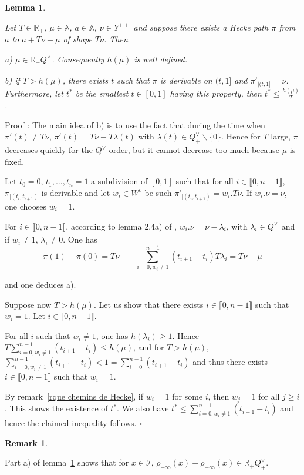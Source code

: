 \documentclass[12pt]{article}
\theoremstyle{plain}
\newtheorem{lemme}[thm]{Lemma}
\theoremstyle{definition}
\newtheorem{rque}[thm]{Remark}
\newcommand{\A}{\mathbb{A}}
\begin{document}
\begin{lemme}\label{lemme fin des chemins de Hecke longs}


Let $T\in \mathbb{R}_+$, $\mu\in \A$,  $a\in \mathbb{A}$, $\nu\in Y^{++}$ and suppose there exists a Hecke path $\pi$ from $a$ to $a+T\nu-\mu$ of shape $T\nu$. Then 

a) $\mu\in \mathbb{R}_+ Q^\vee_+$. Consequently $h(\mu)$ is well defined.

b) if $T>h(\mu)$, there exists $t$ such that $\pi$ is derivable on $(t,1]$ and $\pi'_{|(t,1]}=\nu$. Furthermore, let $t^*$ be the smallest $t \in [0,1]$ having this property, then $t^*\leq \frac{h(\mu)}{T}$.
\end{lemme}


Proof : The main idea of b) is to use the fact that during the time when $\pi'(t)\neq T\nu$, $\pi'(t)=T\nu-T\lambda(t)$ with $\lambda(t)\in Q^\vee_+\backslash \{0\}$. Hence for $T$ large, $\pi$ decreases quickly for the $Q^\vee$ order, but it cannot decrease too much because $\mu$ is fixed.

Let $t_0=0$, $t_1, \ldots,t_n=1$ a subdivision of $[0,1]$ such that for all $i\in \llbracket 0,n-1\rrbracket $, $\pi_{|(t_i,t_{i+1})}$ is derivable and let $w_i\in W^v$ be such $\pi'_{|(t_i,t_{i+1})}=w_i.T\nu$. If $w_i.\nu=\nu$, one chooses $w_i=1$.

For $i\in \llbracket 0,n-1\rrbracket$, according to lemma 2.4a) of \cite{gaussent2014spherical}, $w_i.\nu =\nu -\lambda_i$, with $\lambda_i \in Q^\vee_+$ and if $w_i\neq 1$, $\lambda_i\neq 0$. One has \[\pi(1)-\pi(0)=T\nu+-\sum_{i=0, w_i\neq 1}^{n-1}(t_{i+1}-t_i)T\lambda_i=T\nu +\mu\]

and one deduces a).


Suppose now $T>h(\mu)$. Let us show that there exists $i\in \llbracket 0,n-1\rrbracket$ such that $w_i=1$. Let $i\in \llbracket 0,n-1\rrbracket$. 

For all $i$ such that $w_i\neq 1$, one has $h(\lambda_i)\geq 1$. Hence $T\sum_{i=0, w_i\neq 1}^{n-1}(t_{i+1}-t_i)\leq h(\mu)$, and for $T>h(\mu)$, $\sum_{i=0, w_i\neq 1}^{n-1}(t_{i+1}-t_i)<1=\sum_{i=0}^{n-1}(t_{i+1}-t_i)$ and thus there exists $i\in \llbracket 0,n-1\rrbracket$ such that $w_i=1$.

By remark~\ref{rque chemins de Hecke}, if $w_i=1$ for some $i$, then $w_j=1$ for all $j\geq i$. This shows the existence of $t^*$. We also have $t^*\leq \sum_{i=0, w_i\neq 1}^{n-1}(t_{i+1}-t_i)$ and hence the claimed inequality follows. $\square$


\begin{rque}\label{rque condition sur mu}

 Part a) of lemma~\ref{lemme fin des chemins de Hecke longs} shows that for $x\in \mathcal{I}$, $\rho_{-\infty}(x)-\rho_{+\infty}(x)\in \mathbb{R}_+Q^\vee_+$.
\end{rque}
\end{document}

